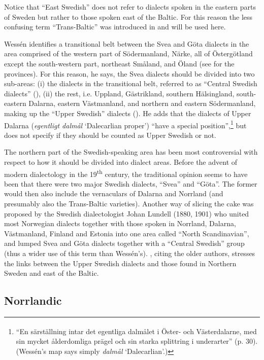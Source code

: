 Notice that “East Swedish” does not refer to dialects spoken in the eastern parts of Sweden but rather to those spoken east of the Baltic. For this reason the less confusing term “Trans-Baltic” was introduced in \citet{Rendahl2001} and will be used here.

Wessén identifies a transitional belt between the Svea and Göta dialects in the area comprised of the western part of Södermanland, Närke, all of Östergötland except the south-western part, northeast Småland, and Öland (see  for the provinces). For this reason, he says, the Svea dialects should be divided into two sub-areas: (i) the dialects in the transitional belt, referred to as “Central Swedish dialects” (), (ii) the rest, i.e. Uppland, Gästrikland, southern Hälsingland, south-eastern Dalarna, eastern Västmanland, and northern and eastern Södermanland, making up the “Upper Swedish” dialects (). He adds that the dialects of Upper Dalarna (\textit{egentligt dalmål} ‘Dalecarlian proper’) \label{bkm:wessenquote}“have a special position”,\footnote{\textsuperscript{ }“En särställning intar det egentliga dalmålet i Öster- och Västerdalarne, med sin mycket ålderdomliga prägel och sin starka splittring i underarter” (p. 30).  (Wessén’s map says simply \textit{dalmål} ‘Dalecarlian’.)} but does not specify if they should be counted as Upper Swedish or not.

The northern part of the Swedish-speaking area has been most controversial with respect to how it should be divided into dialect areas. Before the advent of modern dialectology in the 19\textsuperscript{th} century, the traditional opinion seems to have been that there were two major Swedish dialects, “Svea” and “Göta”. The former would then also include the vernaculars of Dalarna and Norrland (and presumably also the Trans-Baltic varieties). Another way of slicing the cake was proposed by the Swedish dialectologist Johan Lundell (1880, 1901) who united most Norwegian dialects together with those spoken in Norrland, Dalarna, Västmanland, Finland and Estonia into one area called “North Scandinavian”, and lumped Svea and Göta dialects together with a “Central Swedish” group (thus a wider use of this term than Wessén’s). \citet{Hesselman1905}, citing the older authors, stresses the links between the Upper Swedish dialects and those found in Northern Sweden and east of the Baltic. 

\subsection{ Norrlandic}

